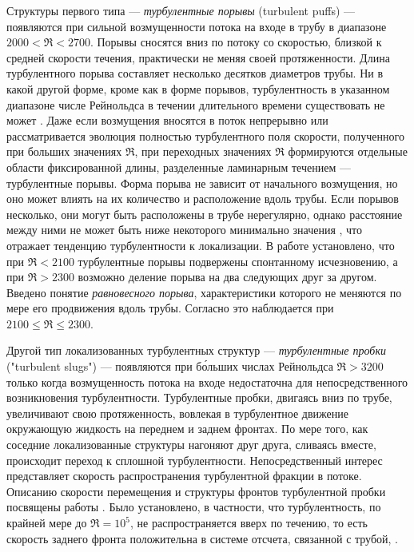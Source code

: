 Структуры первого типа --- {\it турбулентные порывы} (turbulent puffs) --- появляются при сильной возмущенности потока на входе в трубу в диапазоне $2000<\Re<2700$. Порывы сносятся вниз по потоку со скоростью, близкой к средней скорости течения, практически не меняя своей протяженности. Длина турбулентного порыва составляет несколько десятков диаметров трубы. Ни в какой другой форме, кроме как в форме порывов, турбулентность в указанном диапазоне числе Рейнольдса в течении длительного времени существовать не может \cite{vanDoorne2009, Moxey2010, Samanta2011}. Даже если возмущения вносятся в поток непрерывно или рассматривается эволюция полностью турбулентного поля скорости, полученного при больших значениях $\Re$, при переходных значениях $\Re$ формируются отдельные области фиксированной длины, разделенные ламинарным течением --- турбулентные порывы. Форма порыва не зависит от начального возмущения, но оно может влиять на их количество и расположение вдоль трубы. Если порывов несколько, они могут быть расположены в трубе нерегулярно, однако расстояние между ними не может быть ниже некоторого минимально значения \cite{Samanta2011}, что отражает тенденцию турбулентности к локализации. В работе \cite{Wygnanski1975} установлено, что при $\Re<2100$ турбулентные порывы подвержены спонтанному исчезновению, а при $\Re>2300$ возможно деление порыва на два следующих друг за другом. Введено понятие {\it равновесного порыва}, характеристики которого не меняются по мере его продвижения вдоль трубы. Согласно \cite{Wygnanski1975} это наблюдается при $2100\leqslant \Re \leqslant 2300$. 

Другой тип локализованных турбулентных структур --- {\it турбулентные пробки} ("turbulent slugs") --- появляются при б\'{о}льших числах Рейнольдса $\Re>3200$ только когда возмущенность потока на входе недостаточна для непосредственного возникновения турбулентности. Турбулентные пробки, двигаясь вниз по трубе, увеличивают свою протяженность, вовлекая в турбулентное движение окружающую жидкость на переднем и заднем фронтах. По мере того, как соседние локализованные структуры нагоняют друг друга, сливаясь вместе, происходит переход к сплошной турбулентности. Непосредственный интерес представляет скорость распространения турбулентной фракции в потоке. Описанию скорости перемещения и структуры фронтов турбулентной пробки посвящены работы \cite{Lindgren1969, Wygnanski1973, Nishi2008, Duguet2010, Barkley2015}. Было установлено, в частности, что турбулентность, по крайней мере до $\Re = 10^5$, не распространяется вверх по течению, то есть скорость заднего фронта положительна в системе отсчета, связанной с трубой, \cite{Wygnanski1973}. 

